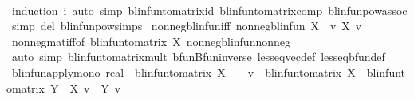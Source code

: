 \begin{isabellebody}
%
\isadelimproof
\ \ %
\endisadelimproof
%
\isatagproof
{}\isamarkupfalse%
\ {\isacharparenleft}{\kern0pt}induction\ i{\isacharparenright}{\kern0pt}\ {\isacharparenleft}{\kern0pt}auto\ simp{\isacharcolon}{\kern0pt}\ blinfun{\isacharunderscore}{\kern0pt}to{\isacharunderscore}{\kern0pt}matrix{\isacharunderscore}{\kern0pt}id\ blinfun{\isacharunderscore}{\kern0pt}to{\isacharunderscore}{\kern0pt}matrix{\isacharunderscore}{\kern0pt}comp\ blinfunpow{\isacharunderscore}{\kern0pt}assoc\ simp\ del{\isacharcolon}{\kern0pt}\ blinfunpow{\isachardot}{\kern0pt}simps{\isacharparenleft}{\kern0pt}{}{\isacharparenright}{\kern0pt}{\isacharparenright}{\kern0pt}%
\endisatagproof
{\isafoldproof}%
%
\isadelimproof
\isanewline
%
\endisadelimproof
\isanewline
{}\isamarkupfalse%
\ nonneg{\isacharunderscore}{\kern0pt}blinfun{\isacharunderscore}{\kern0pt}iff{\isacharcolon}{\kern0pt}\ {\isachardoublequoteopen}nonneg{\isacharunderscore}{\kern0pt}blinfun\ X\ {\isasymlongleftrightarrow}\ {\isacharparenleft}{\kern0pt}{\isasymforall}v{\isasymge}{}{\isachardot}{\kern0pt}\ X\ v\ {\isasymge}\ {}{\isacharparenright}{\kern0pt}{\isachardoublequoteclose}\ \isanewline
%
\isadelimproof
\ \ %
\endisadelimproof
%
\isatagproof
{}\isamarkupfalse%
\ nonneg{\isacharunderscore}{\kern0pt}mat{\isacharunderscore}{\kern0pt}iff{\isacharbrackleft}{\kern0pt}of\ {\isachardoublequoteopen}blinfun{\isacharunderscore}{\kern0pt}to{\isacharunderscore}{\kern0pt}matrix\ X{\isachardoublequoteclose}{\isacharbrackright}{\kern0pt}\ nonneg{\isacharunderscore}{\kern0pt}blinfun{\isacharunderscore}{\kern0pt}nonneg\isanewline
\ \ \isamarkupfalse%
\ {\isacharparenleft}{\kern0pt}auto\ simp{\isacharcolon}{\kern0pt}\ blinfun{\isacharunderscore}{\kern0pt}to{\isacharunderscore}{\kern0pt}matrix{\isacharunderscore}{\kern0pt}mult{\isacharprime}{\kern0pt}{\isacharprime}{\kern0pt}\ bfun{\isachardot}{\kern0pt}Bfun{\isacharunderscore}{\kern0pt}inverse\ less{\isacharunderscore}{\kern0pt}eq{\isacharunderscore}{\kern0pt}vec{\isacharunderscore}{\kern0pt}def\ less{\isacharunderscore}{\kern0pt}eq{\isacharunderscore}{\kern0pt}bfun{\isacharunderscore}{\kern0pt}def{\isacharparenright}{\kern0pt}%
\endisatagproof
{\isafoldproof}%
%
\isadelimproof
\isanewline
%
\endisadelimproof
\isanewline
{}\isamarkupfalse%
\ blinfun{\isacharunderscore}{\kern0pt}apply{\isacharunderscore}{\kern0pt}mono{\isacharcolon}{\kern0pt}\ {\isachardoublequoteopen}{\isacharparenleft}{\kern0pt}{}{\isacharcolon}{\kern0pt}{\isacharcolon}{\kern0pt}real{\isacharcircum}{\kern0pt}{\isacharunderscore}{\kern0pt}{\isacharcircum}{\kern0pt}{\isacharunderscore}{\kern0pt}{\isacharparenright}{\kern0pt}\ {\isasymle}\ blinfun{\isacharunderscore}{\kern0pt}to{\isacharunderscore}{\kern0pt}matrix\ X\ {\isasymLongrightarrow}\ {}\ {\isasymle}\ v\ {\isasymLongrightarrow}\ blinfun{\isacharunderscore}{\kern0pt}to{\isacharunderscore}{\kern0pt}matrix\ X\ {\isasymle}\ blinfun{\isacharunderscore}{\kern0pt}to{\isacharunderscore}{\kern0pt}matrix\ Y\ {\isasymLongrightarrow}\ X\ v\ {\isasymle}\ Y\ v{\isachardoublequoteclose}\isanewline

\end{isabellebody}

